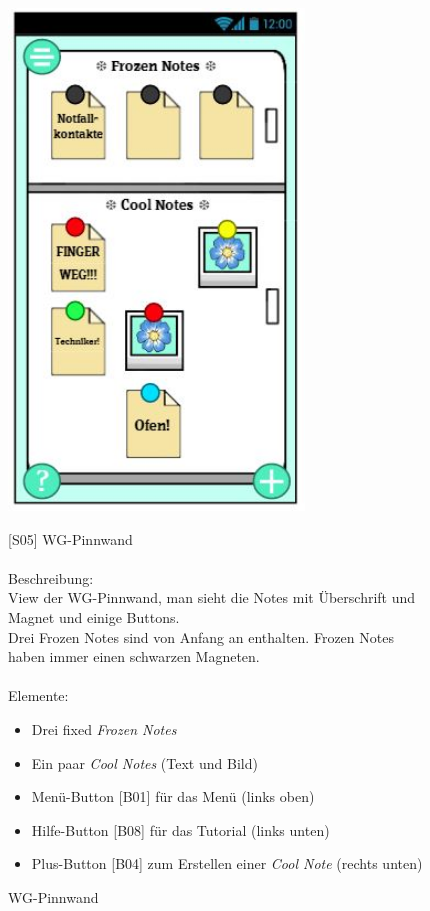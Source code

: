 \documentclass[a4paper]{scrreprt}
\begin{document}
    	\begin{figure}[h]
    		\begin{minipage}[b]{0.4\linewidth}
    			
    			\flushright
    			\centering
    			\includegraphics[width=0.7\textwidth]{fridget_fridge.JPG}
    			\caption{WG-Pinnwand}
    			\label{fig:figure1}
    			\vspace{8cm}
    		\end{minipage}
    		\hspace{0.5cm}
    		\begin{minipage}[b]{0.55\linewidth}
    			\flushleft
    			{[}S05{]} WG-Pinnwand \\
    			\hfill
    			\\Beschreibung: \\
    			View der WG-Pinnwand, man sieht die Notes mit Überschrift und Magnet und einige Buttons. \\ Drei Frozen Notes sind von Anfang an enthalten. Frozen Notes haben immer einen schwarzen Magneten.
    			\\
    			\hfill
    			\\Elemente:
    			\begin{itemize}
    				\renewcommand\labelitemi{--}
    				\item  Drei fixed \textit{Frozen Notes}
    				\item Ein paar \textit{Cool Notes} (Text und Bild)
    				\item Menü-Button {[}B01{]} für das Menü (links oben)
    				\item Hilfe-Button {[}B08{]} für das Tutorial (links unten)
    				\item Plus-Button {[}B04{]} zum Erstellen einer \textit{Cool Note}
    				(rechts unten)
    				

\end{itemize}
\end{minipage}
\end{figure}
\end{document}
